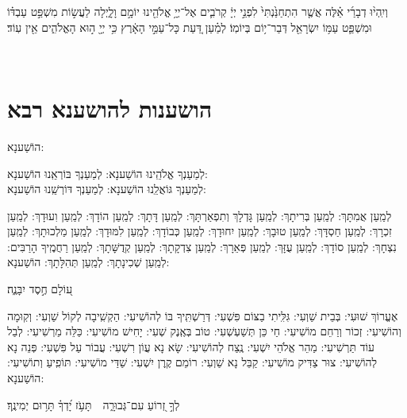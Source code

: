 \documentclass[twoside, openany, parskip=half, 11pt]{book}
\begin{document}
 וְיִֽהְי֨וּ דְבָרַ֜י אֵ֗לֶּה אֲשֶׁ֤ר הִתְחַנַּ֙נְתִּי֙ לִפְנֵ֣י יְיָ֔ קְרֹבִ֛ים אֶל־יְיָ֥ אֱלֹהֵ֖ינוּ יוֹמָ֣ם וָלָ֑יְלָה לַעֲשׂ֣וֹת מִשְׁפַּ֣ט עַבְדּ֗וֹ וּמִשְׁפַּ֛ט עַמּ֥וֹ יִשְׂרָאֵ֖ל דְּבַר־י֥וֹם בְּיוֹמֽוֹ׃  לְמַ֗עַן דַּ֚עַת כָּל־עַמֵּ֣י הָאָ֔רֶץ כִּ֥י יְיָ֖ ה֣וּא הָאֱלֹהִ֑ים אֵ֖ין עֽוֹד׃

 \vfill
{}\\

\clearpage

\vspace{-1\baselineskip}
\section[הושענות להושענא רבא]{ הושענות להושענא רבא }

\begin{Large}
 הוֹשַׁענָא:
 \end{Large}
 
  
  לְמַעַנְךָ אֱלֹהֵֽינוּ הוֹשַׁענָא: לְמַעַנְךָ בּוֹרְאֵֽנוּ הוֹשַׁענָא:\\
לְמַעַנְךָ גּוֹאֲלֵֽנוּ הוֹשַׁענָא: לְמַעַנְךָ דּוֹרְשֵֽׁנוּ הוֹשַׁענָא:

לְמַֽעַן אֲמִתָּךְ: לְמַֽעַן בְּרִיתָךְ: לְמַֽעַן גָּדְלָךְ וְתִפְאַרְתָּךְ: לְמַֽעַן דָּתָךְ: לְמַֽעַן הוֹדָךְ: לְמַֽעַן וִעוּדָךְ: לְמַֽעַן זִכְרָךְ: לְמַֽעַן חַסְדָּךְ: לְמַֽעַן טוּבָךְ: לְמַֽעַן יִחוּדָךְ: לְמַֽעַן כְּבוֹדָךְ: לְמַֽעַן לִמּוּדָךְ: לְמַֽעַן מַלְכוּתָךְ: לְמַֽעַן נִצְחָךְ: לְמַֽעַן סוֹדָךְ: לְמַֽעַן עֻזָּךְ: לְמַֽעַן פְּאֵרָךְ: לְמַֽעַן צִדְקָתָךְ: לְמַֽעַן קְדֻשָּׁתָךְ: לְמַֽעַן רַחֲמֶֽיךָ הָרַבִּים:
לְמַֽעַן שְׁכִינָתָךְ:
 לְמַֽעַן תְּהִלָּתָךְ: הוֹשַׁענָא:

ע֭וֹלָם חֶ֣סֶד יִבָּנֶ֑ה׃

אֶעֱרוֹךְ שׁוּעִי: בְּבֵית שַׁוְעִי: גִּלִּֽיתִי בַצּוֹם פִּשְׁעִי: דְּרַשְׁתִּֽיךָ בּוֹ לְהוֹשִׁיעִי: הַקְשִֽׁיבָה לְקוֹל שַׁוְעִי: וְקֽוּמָה וְהוֹשִׁיעִי: זְכוֹר וְרַחֵם מוֹשִׁיעִי: חַי כֵּן תְּשַׁעְשְׁעִי: טוֹב בְּאֶֽנֶק שְׁעִי: יָחִישׁ מוֹשִׁיעִי: כַּלֵּה מַרְשִׁיעִי: לְבַל עוֹד תַּרְשִׁיעִי: מַהֵר אֱלֹהֵי יִשְׁעִי: נֶֽצַח לְהוֹשִׁיעִי: שָׂא נָא עֲוֹן רִשְׁעִי: עֲבוֹר עַל פִּשְׁעִי: פְּנֵה נָא לְהוֹשִׁיעִי: צוּר צַדִּיק מוֹשִׁיעִי: קַבֵּל נָא שַׁוְעִי: רוֹמֵם קֶֽרֶן יִשְׁעִי:
שַׁדַּי מוֹשִׁיעִי: 
תּוֹפִֽיעַ וְתוֹשִׁיעִי: הוֹשַׁענָא:

 לְךָ֣ זְ֭רוֹעַ עִם־גְּבוּרָ֑ה תָּעֹ֥ז יָ֝דְךָ֗ תָּר֥וּם יְמִינֶֽךָ׃
\end{document}
